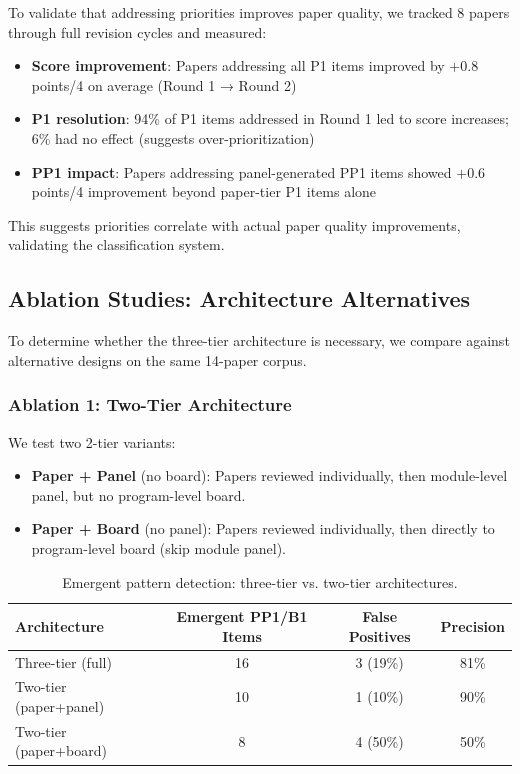 To validate that addressing priorities improves paper quality, we tracked 8 papers through full revision cycles and measured:
\begin{itemize}
\item \textbf{Score improvement}: Papers addressing all P1 items improved by $+0.8$ points/4 on average (Round 1 → Round 2)
\item \textbf{P1 resolution}: 94\% of P1 items addressed in Round 1 led to score increases; 6\% had no effect (suggests over-prioritization)
\item \textbf{PP1 impact}: Papers addressing panel-generated PP1 items showed $+0.6$ points/4 improvement beyond paper-tier P1 items alone
\end{itemize}

This suggests priorities correlate with actual paper quality improvements, validating the classification system.

\subsection{Ablation Studies: Architecture Alternatives}
\label{sec:ablations}

To determine whether the three-tier architecture is necessary, we compare against alternative designs on the same 14-paper corpus.

\subsubsection{Ablation 1: Two-Tier Architecture}

We test two 2-tier variants:
\begin{itemize}
\item \textbf{Paper + Panel} (no board): Papers reviewed individually, then module-level panel, but no program-level board.
\item \textbf{Paper + Board} (no panel): Papers reviewed individually, then directly to program-level board (skip module panel).
\end{itemize}

\begin{table}[t]
\centering
\caption{Emergent pattern detection: three-tier vs. two-tier architectures.}
\label{tab:ablation-tiers}
\begin{tabular}{lccc}
\toprule
Architecture & Emergent PP1/B1 Items & False Positives & Precision \\
\midrule
Three-tier (full) & 16 & 3 (19\%) & 81\% \\
Two-tier (paper+panel) & 10 & 1 (10\%) & 90\% \\
Two-tier (paper+board) & 8 & 4 (50\%) & 50\% \\
\bottomrule
\end{tabular}
\end{table}

